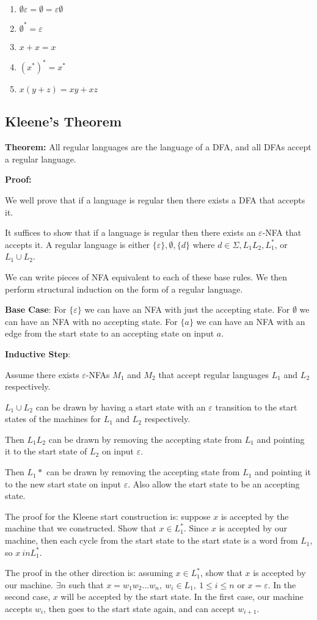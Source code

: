 \documentclass[12pt]{article}
\begin{document}
\begin{enumerate}
    \item $\emptyset \varepsilon = \emptyset = \varepsilon \emptyset$
    \item $\emptyset^* = \varepsilon$
    \item $x + x = x$
    \item $(x^*)^* = x^*$
    \item $x(y + z) = xy + xz$
\end{enumerate}

\subsection{Kleene's Theorem}

\textbf{Theorem:} All regular languages are the language of a DFA, and all DFAs
accept a regular language.

\textbf{Proof:}

We well prove that if a language is regular then there exists a DFA that accepts
it.

It suffices to show that if a language is regular then there exists an
$\varepsilon$-NFA that accepts it. A regular language is either
$\{\varepsilon\}, \emptyset, \{d\}$ where $d \in \Sigma, L_1L_2, L_1^*$, or
$L_1\cup L_2$.

We can write pieces of NFA equivalent to each of these base rules. We then
perform structural induction on the form of a regular language.

\textbf{Base Case}:
For $\{\varepsilon\}$ we can have an NFA with just the accepting state.
For $\emptyset$ we can have an NFA with no accepting state.
For $\{a\}$ we can have an NFA with an edge from the start state to an accepting
state on input $a$.

\textbf{Inductive Step}:

Assume there exists $\varepsilon$-NFAs $M_1$ and $M_2$ that accept regular
languages $L_1$ and $L_2$ respectively.

$L_1\cup L_2$ can be drawn by having a start state with an $\varepsilon$
transition to the start states of the machines for $L_1$ and $L_2$ respectively.

Then $L_1L_2$ can be drawn by removing the accepting state from $L_1$ and
pointing it to the start state of $L_2$ on input $\varepsilon$.

Then $L_1*$ can be drawn by removing the accepting state from $L_1$ and pointing
it to the new start state on input $\varepsilon$. Also allow the start
state to be an accepting state.

The proof for the Kleene start construction is: suppose $x$ is accepted by the
machine that we constructed. Show that $x \in L_1^*$. Since $x$ is accepted by
our machine, then each cycle from the start state to the start state is a
word from $L_1$, so $x \ in L_1^*$.

The proof in the other direction is: assuming $x \in L_1^*$, show that $x$ is
accepted by our machine. $\exists n$ such that $x = w_1w_2\dots w_n,\ w_i \in
L_1,\ 1 \leq i \leq n$ or $x = \varepsilon$. In the second case, $x$ will be
accepted by the start state. In the first case, our machine accepts $w_i$, then
goes to the start state again, and can accept $w_{i+1}$.
\end{document}
